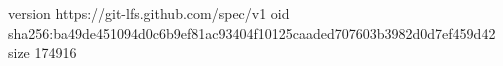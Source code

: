 version https://git-lfs.github.com/spec/v1
oid sha256:ba49de451094d0c6b9ef81ac93404f10125caaded707603b3982d0d7ef459d42
size 174916
